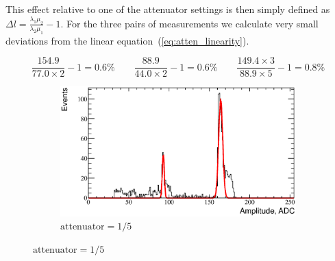 \documentclass[a4paper,12pt]{article}
\begin{document}
\noindent
This effect relative to one of the attenuator settings is then simply defined as
$\Delta l = \frac{\lambda_1 \mu_2}{\lambda_2 \mu_1} - 1$. For the three pairs
of measurements we calculate very small deviations from the linear
equation~(\ref{eq:atten_linearity}).

\begin{equation}
\frac{154.9}{77.0 \times 2} - 1 = 0.6\%
\qquad
\frac{88.9}{44.0 \times 2} - 1 = 0.6\%
\qquad
\frac{149.4 \times 3}{88.9 \times 5} - 1 = 0.8\%
\end{equation}


\begin{figure}[htb]
\centering
\begin{subfigure}[t]{0.49\textwidth}
\includegraphics[width=\textwidth]{gfx/atten_1_over_5_ch06.eps}
\caption{$\text{attenuator}=1/5$}
\label{fig:atten_distrib_nominal}
\end{subfigure}


\end{figure}
\end{document}
